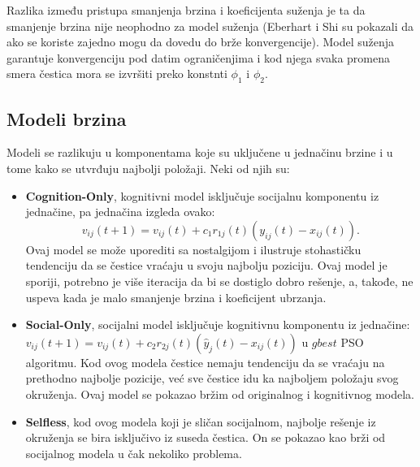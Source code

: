 \documentclass[a4paper]{article}
\begin{document}
Razlika između pristupa smanjenja brzina i koeficijenta suženja je ta da smanjenje brzina nije neophodno za model suženja (Eberhart i Shi su pokazali da ako se koriste zajedno mogu da dovedu do brže konvergencije). Model suženja garantuje konvergenciju pod datim ograničenjima i kod njega svaka promena smera čestica mora se izvršiti preko konstnti $\phi_1$ i $\phi_2$.

\subsection{Modeli brzina}
Modeli se razlikuju u komponentama koje su uključene u jednačinu brzine i u tome kako se utvrđuju najbolji položaji. Neki od njih su:
\begin{itemize}
    \item \textbf{Cognition-Only}, kognitivni model isključuje socijalnu komponentu iz jednačine, pa jednačina izgleda ovako: $$v_{ij} (t + 1) = v_{ij} (t) + c_1r_{1j} (t)(y_{ij} (t) - x_{ij} (t)).$$ Ovaj model se može uporediti sa nostalgijom i ilustruje stohastičku tendenciju  da se čestice vraćaju u svoju najbolju poziciju. Ovaj model je sporiji, potrebno je više iteracija da bi se dostiglo dobro rešenje, a, takođe, ne uspeva kada je malo smanjenje brzina i koeficijent ubrzanja.
    \item \textbf{Social-Only}, socijalni model isključuje kognitivnu komponentu iz jednačine: $v_{ij} (t + 1) = v_{ij} (t) + c_2r_{2j} (t)(\hat{y}_j (t) - x_{ij} (t))$ u $gbest$ PSO algoritmu. Kod ovog modela čestice nemaju tendenciju da se vraćaju na prethodno najbolje pozicije, već sve čestice idu ka najboljem položaju svog okruženja. Ovaj model se pokazao bržim od originalnog i kognitivnog modela.
    \item \textbf{Selfless}, kod ovog modela koji je sličan socijalnom, najbolje rešenje iz okruženja se bira isključivo iz suseda čestica. On se pokazao kao brži od socijalnog modela u čak nekoliko problema.
\end{itemize}
\end{document}
